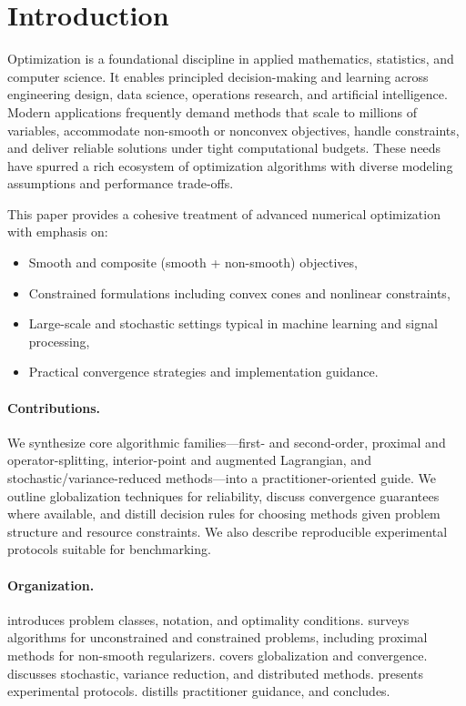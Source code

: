 \section{Introduction}
Optimization is a foundational discipline in applied mathematics, statistics, and computer science. It enables principled decision-making and learning across engineering design, data science, operations research, and artificial intelligence. Modern applications frequently demand methods that scale to millions of variables, accommodate non-smooth or nonconvex objectives, handle constraints, and deliver reliable solutions under tight computational budgets. These needs have spurred a rich ecosystem of optimization algorithms with diverse modeling assumptions and performance trade-offs.

This paper provides a cohesive treatment of advanced numerical optimization with emphasis on:
\begin{itemize}
  \item Smooth and composite (smooth + non-smooth) objectives,
  \item Constrained formulations including convex cones and nonlinear constraints,
  \item Large-scale and stochastic settings typical in machine learning and signal processing,
  \item Practical convergence strategies and implementation guidance.
\end{itemize}

\paragraph{Contributions.} We synthesize core algorithmic families—first- and second-order, proximal and operator-splitting, interior-point and augmented Lagrangian, and stochastic/variance-reduced methods—into a practitioner-oriented guide. We outline globalization techniques for reliability, discuss convergence guarantees where available, and distill decision rules for choosing methods given problem structure and resource constraints. We also describe reproducible experimental protocols suitable for benchmarking.

\paragraph{Organization.}  introduces problem classes, notation, and optimality conditions.  surveys algorithms for unconstrained and constrained problems, including proximal methods for non-smooth regularizers.  covers globalization and convergence.  discusses stochastic, variance reduction, and distributed methods.  presents experimental protocols.  distills practitioner guidance, and  concludes.